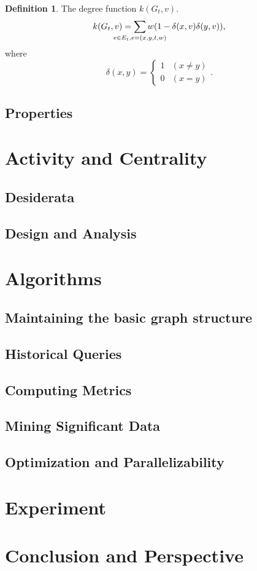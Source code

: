 \documentclass[12pt,abstract=true]{scrartcl}
\numberwithin{equation}{section}
\theoremstyle{definition}   \newtheorem{definition}{Definition}[section]
\theoremstyle{plain}        \newtheorem{theorem}{Theorem}[section]
\theoremstyle{plain}        \newtheorem{observation}{Observation}[section]
\theoremstyle{plain}        \newtheorem{fact}{Fact}[section]
\theoremstyle{plain}        \newtheorem{claim}{Claim}[section]
\theoremstyle{plain}        \newtheorem{lemma}[theorem]{Lemma}
\theoremstyle{plain}        \newtheorem{corollary}[theorem]{Corollary}
\theoremstyle{remark}       \newtheorem{example}{Example}[section]
\theoremstyle{remark}       \newtheorem{remark}{Remark}[section]
\begin{document}
\begin{definition}
The degree function $k(G_t,v)$.
\begin{equation}
k(G_t,v)=\sum_{\mathclap{e\in E_t, e=(x,y,t,w)}}w(1-\delta(x,v)\delta(y,v)),
\end{equation}
where \begin{equation}
\delta(x,y)=\begin{cases}1&(x\neq y)\\0&(x=y)\end{cases}.
\end{equation}
\end{definition}

\subsection{Properties}
\section{Activity and Centrality}
\subsection{Desiderata}
\subsection{Design and Analysis}
\section{Algorithms}
\subsection{Maintaining the basic graph structure}
\subsection{Historical Queries}
\subsection{Computing Metrics}
\subsection{Mining Significant Data}
\subsection{Optimization and Parallelizability}
\section{Experiment}
\section{Conclusion and Perspective}
\nocite{*}

\end{document}
